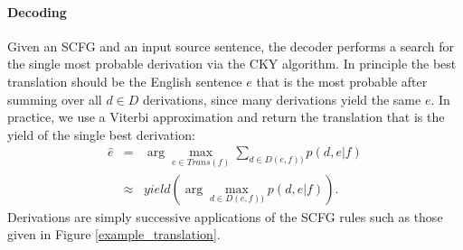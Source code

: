\documentclass[11pt]{article}
\begin{document}
\paragraph{Decoding}

Given an SCFG and an input source sentence, the decoder performs a
search for the single most probable derivation via the CKY algorithm.
In principle the best translation should be the English sentence $e$
that is the most probable after summing over all $d\in D$ derivations,
since many derivations yield the same $e$.  In practice, we use a
Viterbi approximation and return the translation that is the yield of
the single best derivation:
\begin{eqnarray}
  \label{decoding_eq}
  \hat{e} &=& \arg \max_{e\in Trans(f)} \sum_{d\in D(e,f))}{p(d,e|f)}
  \nonumber \\
             &\approx& yield(\arg \max_{d\in D(e,f))}{p(d,e|f)}).
\end{eqnarray}
Derivations are simply successive applications of the SCFG rules such
as those given in Figure \ref{example_translation}.
\end{document}
